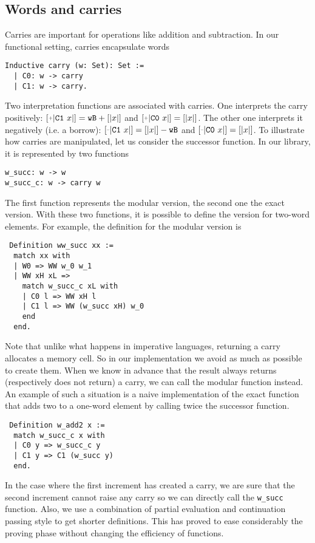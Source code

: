\subsection{Words and carries}

Carries are important for operations like addition and subtraction.
In our functional setting, carries encapsulate words
\begin{verbatim}
Inductive carry (w: Set): Set :=
  | C0: w -> carry
  | C1: w -> carry.
\end{verbatim}
Two interpretation functions are associated with carries.
One interprets the carry positively: $\ICP{\CI x} = \wB + [|x|]$ and
$\ICP{\CO x} = [|x|]$. 
The other one interprets it negatively (i.e. a borrow):
$\ICM{\CI x} = [|x|] - \wB$ and $\ICM{\CO x} = [|x|]$.
To illustrate how carries are manipulated, let us consider the successor function.
In our library, it is represented by two functions
\begin{verbatim}
w_succ: w -> w
w_succ_c: w -> carry w
\end{verbatim}
The first function represents the modular version, the second one the exact 
version. With these two functions, it is possible to define the version
for two-word elements. For example, the definition for the modular version is
\begin{verbatim}
 Definition ww_succ xx :=
  match xx with
  | W0 => WW w_0 w_1
  | WW xH xL =>
    match w_succ_c xL with
    | C0 l => WW xH l
    | C1 l => WW (w_succ xH) w_0
    end
  end.
\end{verbatim}
Note that unlike what happens in imperative languages, returning
a carry allocates a memory cell. So in our implementation
we avoid as much as possible to create them. When we know in advance 
that the result always returns (respectively does not return) a carry, we can call the modular function instead. 
An example of such a situation is a naive implementation of the exact function that adds two to a 
one-word element by calling twice the successor function.
\begin{verbatim}
 Definition w_add2 x :=
  match w_succ_c x with
  | C0 y => w_succ_c y
  | C1 y => C1 (w_succ y)
  end.
\end{verbatim}
In the case where the first increment has created a carry, we are sure that the second
increment cannot raise any carry so we can directly call the {\tt w\_succ} function.
Also, we use a combination of partial evaluation and continuation passing style to get
shorter definitions. This has proved to ease considerably the proving phase without
changing the efficiency of functions.

